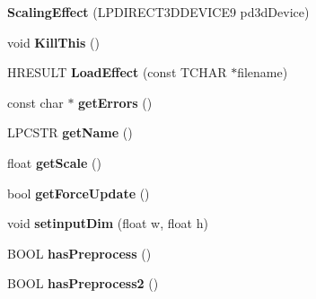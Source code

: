 \begin{DoxyCompactItemize}
\item 
\hypertarget{classScalingEffect_a5b9fb804cea43684c9ee59b400cdb198}{{\bfseries Scaling\-Effect} (L\-P\-D\-I\-R\-E\-C\-T3\-D\-D\-E\-V\-I\-C\-E9 pd3d\-Device)}\label{classScalingEffect_a5b9fb804cea43684c9ee59b400cdb198}

\item 
\hypertarget{classScalingEffect_ab0410f4b67129d1f9b1283fc9220a514}{void {\bfseries Kill\-This} ()}\label{classScalingEffect_ab0410f4b67129d1f9b1283fc9220a514}

\item 
\hypertarget{classScalingEffect_a384d9c1ef17cea2e52060019ab357d23}{H\-R\-E\-S\-U\-L\-T {\bfseries Load\-Effect} (const T\-C\-H\-A\-R $\ast$filename)}\label{classScalingEffect_a384d9c1ef17cea2e52060019ab357d23}

\item 
\hypertarget{classScalingEffect_a043e2ea7ac7ff4c2378d3ad4969ca001}{const char $\ast$ {\bfseries get\-Errors} ()}\label{classScalingEffect_a043e2ea7ac7ff4c2378d3ad4969ca001}

\item 
\hypertarget{classScalingEffect_a4aa74511385cc87ae3ca3f4e843207a7}{L\-P\-C\-S\-T\-R {\bfseries get\-Name} ()}\label{classScalingEffect_a4aa74511385cc87ae3ca3f4e843207a7}

\item 
\hypertarget{classScalingEffect_a81626be50b958c1635880735f7c13073}{float {\bfseries get\-Scale} ()}\label{classScalingEffect_a81626be50b958c1635880735f7c13073}

\item 
\hypertarget{classScalingEffect_a678a8722d7fa055a0803c69612ae69b5}{bool {\bfseries get\-Force\-Update} ()}\label{classScalingEffect_a678a8722d7fa055a0803c69612ae69b5}

\item 
\hypertarget{classScalingEffect_aab819fa60ad0e7256de7626b4dba98c9}{void {\bfseries setinput\-Dim} (float w, float h)}\label{classScalingEffect_aab819fa60ad0e7256de7626b4dba98c9}

\item 
\hypertarget{classScalingEffect_a77feeed9aa1989008a3e7006d98ae64f}{B\-O\-O\-L {\bfseries has\-Preprocess} ()}\label{classScalingEffect_a77feeed9aa1989008a3e7006d98ae64f}

\item 
\hypertarget{classScalingEffect_a6a3ff1ecff8d3a379e603066d0c2b9ad}{B\-O\-O\-L {\bfseries has\-Preprocess2} ()}\label{classScalingEffect_a6a3ff1ecff8d3a379e603066d0c2b9ad}


\end{DoxyCompactItemize}
